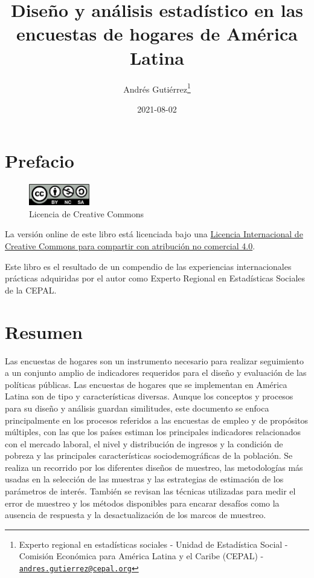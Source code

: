 \documentclass[
  10pt,
  spanish,
]{book}
\title{Diseño y análisis estadístico en las encuestas de hogares de América Latina}
\author{Andrés Gutiérrez\footnote{Experto regional en estadísticas sociales - Unidad de Estadística Social - Comisión Económica para América Latina y el Caribe (CEPAL) - \href{mailto:andres.gutierrez@cepal.org}{\nolinkurl{andres.gutierrez@cepal.org}}}}
\date{2021-08-02}
\begin{document}
\maketitle

{
\hypersetup{linkcolor=}
\setcounter{tocdepth}{1}
\tableofcontents
}
\listoftables
\listoffigures
\hypertarget{prefacio}{%
\chapter*{Prefacio}\label{prefacio}}

\begin{figure}
\includegraphics[width=100px]{Pics/CClicence} \caption{Licencia de Creative Commons}\label{fig:unnamed-chunk-1}
\end{figure}

La versión online de este libro está licenciada bajo una \href{http://creativecommons.org/licenses/by-nc-sa/4.0/}{Licencia Internacional de Creative Commons para compartir con atribución no comercial 4.0}.

Este libro es el resultado de un compendio de las experiencias internacionales prácticas adquiridas por el autor como Experto Regional en Estadísticas Sociales de la CEPAL.

\hypertarget{resumen}{%
\chapter*{Resumen}\label{resumen}}

Las encuestas de hogares son un instrumento necesario para realizar seguimiento a un conjunto amplio de indicadores requeridos para el diseño y evaluación de las políticas públicas. Las encuestas de hogares que se implementan en América Latina son de tipo y características diversas. Aunque los conceptos y procesos para su diseño y análisis guardan similitudes, este documento se enfoca principalmente en los procesos referidos a las encuestas de empleo y de propósitos múltiples, con las que los países estiman los principales indicadores relacionados con el mercado laboral, el nivel y distribución de ingresos y la condición de pobreza y las principales características sociodemográficas de la población. Se realiza un recorrido por los diferentes diseños de muestreo, las metodologías más usadas en la selección de las muestras y las estrategias de estimación de los parámetros de interés. También se revisan las técnicas utilizadas para medir el error de muestreo y los métodos disponibles para encarar desafíos como la ausencia de respuesta y la desactualización de los marcos de muestreo.
\end{document}
